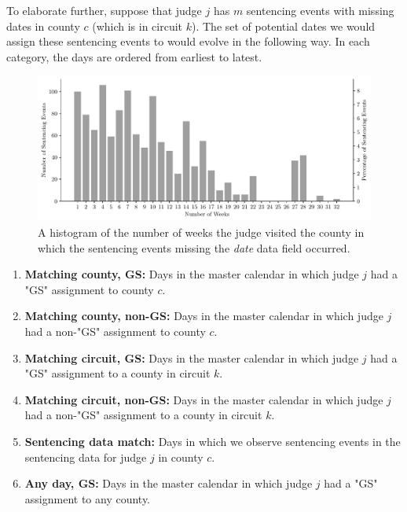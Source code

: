 \documentclass[11pt, oneside]{article}   	%
\theoremstyle{ModifiedStyle}
\begin{document}
      To elaborate further, suppose that judge $j$ has $m$ sentencing events with missing dates in county $c$ (which is in circuit $k$). The set of potential dates we would assign these sentencing events to would evolve in the following way. In each category, the days are ordered from earliest to latest.

			\begin{figure}[H]
				\centering
				\includegraphics[scale=0.75]{Figures/Missing_Date_Histogram_of_Potential_Week_Histogram}
				\vspace{-2mm}
				\caption{A histogram of the number of weeks the judge visited the county in which the sentencing events missing the \emph{date} data field occurred.}
				\label{Figure_Missing_Date_Histogram_of_Potential_Week_Histogram}
			\end{figure}

      \begin{enumerate}
        \item \textbf{Matching county, GS:} Days in the master calendar in which judge $j$ had a "GS" assignment to county $c$.
        \item \textbf{Matching county, non-GS:} Days in the master calendar in which judge $j$ had a non-"GS" assignment to county $c$.
        \item \textbf{Matching circuit, GS:} Days in the master calendar in which judge $j$ had a "GS" assignment to a county in circuit $k$.
        \item \textbf{Matching circuit, non-GS:} Days in the master calendar in which judge $j$ had a non-"GS" assignment to a county in circuit $k$.
        \item \textbf{Sentencing data match:} Days in which we observe sentencing events in the sentencing data for judge $j$ in county $c$.
        \item \textbf{Any day, GS:} Days in the master calendar in which judge $j$ had a "GS" assignment to any county.
      \end{enumerate}
\end{document}
